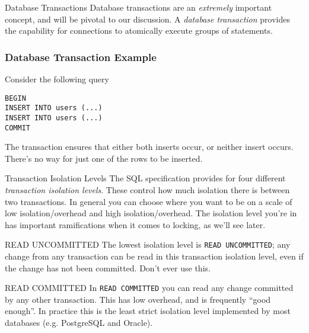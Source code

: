 \documentclass[14pt]{beamer}
\begin{document}
\begin{frame}{Database Transactions}
  Database transactions are an \emph{extremely} important concept, and will be
  pivotal to our discussion.
  \pause
  \newline
  \newline
  A \emph{database transaction} provides the capability for connections to atomically execute groups of statements.
\end{frame}

\begin{frame}[fragile]
  \frametitle{Database Transaction Example}
  Consider the following query
  \begin{verbatim}
BEGIN
INSERT INTO users (...)
INSERT INTO users (...)
COMMIT
  \end{verbatim}

  The transaction ensures that either both inserts occur, or neither insert
  occurs. There's no way for just one of the rows to be inserted.
\end{frame}

\begin{frame}{Transaction Isolation Levels}
  The SQL specification provides for four different \emph{transaction isolation
    levels}. These control how much isolation there is between two transactions.
  \newline
  \newline
  In general you can choose where you want to be on a scale of low
  isolation/overhead and high isolation/overhead. The isolation level you're in
  has important ramifications when it comes to locking, as we'll see later.
\end{frame}

\begin{frame}{READ UNCOMMITTED}
  The lowest isolation level is \texttt{READ UNCOMMITTED}; any change from any
  transaction can be read in this transaction isolation level, even if the
  change has not been committed.
  \newline
  \newline
  Don't ever use this.
\end{frame}

\begin{frame}{READ COMMITTED}
  In \texttt{READ COMMITTED} you can read any change committed by any other
  transaction. This has low overhead, and is frequently ``good enough''.
  \newline
  \newline
  In practice this is the least strict isolation level implemented by most
  databases (e.g. PostgreSQL and Oracle).
\end{frame}
\end{document}
